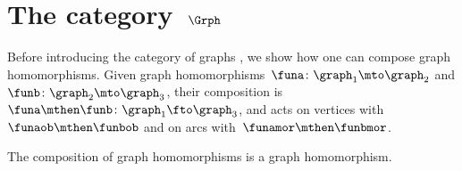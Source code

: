 
\section[The category~$\Grph$]{The category~$\Grph$}
\label{sec:cat-grph}

Before introducing the category of graphs \Grph, we show how one can compose graph homomorphisms.
Given graph homomorphisms~$\funa\colon \graph_1\mto \graph_2$ and $\funb\colon \graph_2\mto \graph_3$, their composition is $\funa\mthen \funb \colon \graph_1 \fto \graph_3$, and acts on vertices with~$\funaob \mthen \funbob$ and on arcs with~$\funamor \mthen \funbmor$.

\begin{lemma}
    \label{lem:composing_homomorphisms}
    The composition of graph homomorphisms is a graph homomorphism.
\end{lemma}
%
